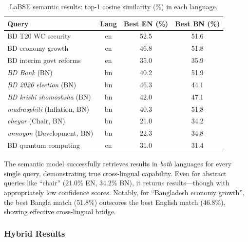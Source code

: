\documentclass[12pt,a4paper]{article}
\newcommand{\bn}[1]{\textit{#1}}
\begin{document}
\begin{table}[H]
\centering
\caption{LaBSE semantic results: top-1 cosine similarity (\%) in each language.}
\label{tab:semantic_results}
\begin{tabular}{p{3.5cm}ccc}
\toprule
\textbf{Query} & \textbf{Lang} & \textbf{Best EN (\%)} & \textbf{Best BN (\%)} \\
\midrule
BD T20 WC security      & en & 52.5 & 51.6 \\
BD economy growth        & en & 46.8 & 51.8 \\
BD interim govt reforms  & en & 35.0 & 35.9 \\
\bn{BD Bank} (BN)        & bn & 40.2 & 51.9 \\
\bn{BD 2026 election} (BN) & bn & 46.3 & 44.1 \\
\bn{BD krishi shomoshsha} (BN) & bn & 42.0 & 47.1 \\
\bn{mudrasphiti} (Inflation, BN)  & bn & 40.3 & 51.8 \\
\bn{cheyar} (Chair, BN) & bn & 21.0 & 34.2 \\
\bn{unnoyon} (Development, BN) & bn & 22.3 & 34.8 \\
BD quantum computing     & en & 31.0 & 31.4 \\
\bottomrule
\end{tabular}
\end{table}

The semantic model successfully retrieves results in \textit{both} languages for every single query, demonstrating true cross-lingual capability. Even for abstract queries like ``chair'' (21.0\% EN, 34.2\% BN), it returns results---though with appropriately low confidence scores. Notably, for ``Bangladesh economy growth'', the best Bangla match (51.8\%) outscores the best English match (46.8\%), showing effective cross-lingual bridge.


\subsubsection{Hybrid Results}
\end{document}
